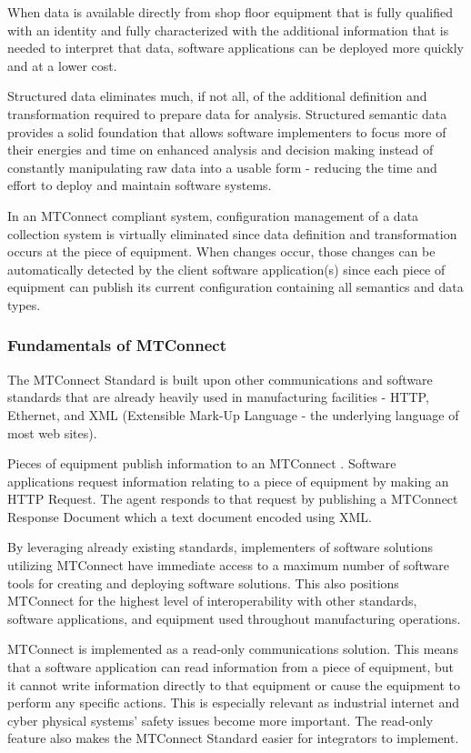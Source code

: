 When data is available directly from shop floor equipment that is fully qualified with an identity and fully characterized with the additional information that is needed to interpret that data, software applications can be deployed more quickly and at a lower cost.    

Structured data eliminates much, if not all, of the additional definition and transformation required to prepare data for analysis.   Structured semantic data provides a solid foundation that allows software implementers to focus more of their energies and time on enhanced analysis and decision making instead of constantly manipulating raw data into a usable form - reducing the time and effort to deploy and maintain software systems.  
 
In an MTConnect compliant system, configuration management of a data collection system is virtually eliminated since data definition and transformation occurs at the piece of equipment.   When changes occur, those changes can be automatically detected by the client software application(s) since each piece of equipment can publish its current configuration containing all semantics and data types.

\subsubsection{Fundamentals of MTConnect}

The MTConnect Standard is built upon other communications and software standards that are already heavily used in manufacturing facilities - HTTP, Ethernet, and XML (Extensible Mark-Up Language - the underlying language of most web sites).
 
Pieces of equipment publish information to an MTConnect .  Software applications request information relating to a piece of equipment by making an HTTP Request. The agent responds to that request by publishing a MTConnect Response Document which a text document encoded using XML.   
 
By leveraging already existing standards, implementers of software solutions utilizing MTConnect have immediate access to a maximum number of software tools for creating and deploying software solutions.   This also positions MTConnect for the highest level of interoperability with other standards, software applications, and equipment used throughout manufacturing operations.    
 
MTConnect is implemented as a read-only communications solution.   This means that a software application can read information from a piece of equipment, but it cannot write information directly to that equipment or cause the equipment to perform any specific actions.  This is especially relevant as industrial internet and cyber physical systems' safety issues become more important.  The read-only feature also makes the MTConnect Standard easier for integrators to implement. 
 
